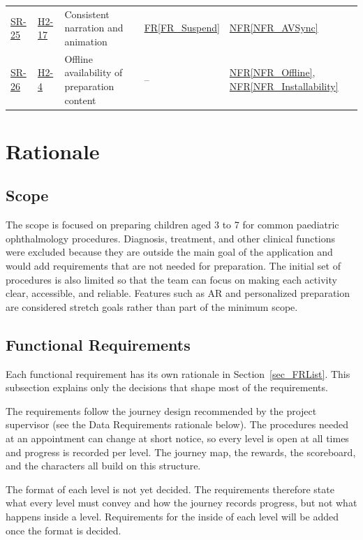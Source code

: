 \documentclass[10pt]{article}
\newcommand{\rref}[1]{\hyperref[#1]{FR\ref*{#1}}}
\newcommand{\nfrref}[1]{\hyperref[#1]{NFR\ref*{#1}}}
\newcommand{\haurl}{https://team-hindsight.github.io/ophthamology-game/HazardAnalysis/HazardAnalysis.pdf}
\newcommand{\hasrref}[2]{\href{\haurl\#nameddest=sr:#1}{SR-#2}}
\newcommand{\hahazref}[2]{\href{\haurl\#nameddest=haz:#1}{H#2}}
\begin{document}
\begin{longtable}{p{} p{} >{\raggedright\arraybackslash}p{} >{\raggedright\arraybackslash}p{} >{\raggedright\arraybackslash}p{}}
\hasrref{ConsistentAudioVisuals}{25} & \hahazref{AudioVisualMismatch}{2-17} & Consistent narration and animation & \rref{FR_Suspend} & \nfrref{NFR_AVSync} \\
\hasrref{OfflinePreparation}{26} & \hahazref{OfflineContentUnavailable}{2-4} & Offline availability of preparation content & -- & \nfrref{NFR_Offline}, \nfrref{NFR_Installability} \\
\end{longtable}

\newpage
\section{Rationale}
\label{rationale}

\subsection{Scope}

The scope is focused on preparing children aged 3 to 7 for common paediatric
ophthalmology procedures. Diagnosis, treatment, and other clinical functions
were excluded because they are outside the main goal of the application and
would add requirements that are not needed for preparation. The initial set
of procedures is also limited so that the team can focus on making each
activity clear, accessible, and reliable. Features such as AR and personalized
preparation are considered stretch goals rather than part of the minimum
scope.

\subsection{Functional Requirements}

Each functional requirement has its own rationale in Section~\ref{sec_FRList}.
This subsection explains only the decisions that shape most of the
requirements.

The requirements follow the journey design recommended by the project
supervisor (see the Data Requirements rationale below). The procedures needed
at an appointment can change at short notice, so every level is open at all
times and progress is recorded per level. The journey map, the rewards, the
scoreboard, and the characters all build on this structure.

The format of each level is not yet decided. The requirements therefore state
what every level must convey and how the journey records progress, but not
what happens inside a level. Requirements for the inside of each level will be
added once the format is decided.
\end{document}
